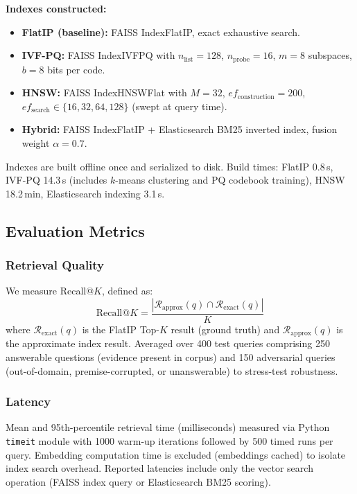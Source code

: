 \documentclass[conference]{IEEEtran}
\begin{document}
\textbf{Indexes constructed:}
\begin{itemize}
    \item \textbf{FlatIP (baseline):} FAISS IndexFlatIP, exact exhaustive search.
    \item \textbf{IVF-PQ:} FAISS IndexIVFPQ with $n_{\mathrm{list}}{=}128$, $n_{\mathrm{probe}}{=}16$, $m{=}8$ subspaces, $b{=}8$ bits per code.
    \item \textbf{HNSW:} FAISS IndexHNSWFlat with $M{=}32$, $ef_{\mathrm{construction}}{=}200$, $ef_{\mathrm{search}} \in \{16, 32, 64, 128\}$ (swept at query time).
    \item \textbf{Hybrid:} FAISS IndexFlatIP + Elasticsearch BM25 inverted index, fusion weight $\alpha{=}0.7$.
\end{itemize}

Indexes are built offline once and serialized to disk. Build times: FlatIP 0.8\,s, IVF-PQ 14.3\,s (includes $k$-means clustering and PQ codebook training), HNSW 18.2\,min, Elasticsearch indexing 3.1\,s.

\subsection{Evaluation Metrics}

\subsubsection{Retrieval Quality}
We measure Recall@$K$, defined as:
\begin{equation}
\mathrm{Recall@}K = \frac{|\mathcal{R}_{\mathrm{approx}}(q) \cap \mathcal{R}_{\mathrm{exact}}(q)|}{K}
\label{eq:recall}
\end{equation}
where $\mathcal{R}_{\mathrm{exact}}(q)$ is the FlatIP Top-$K$ result (ground truth) and $\mathcal{R}_{\mathrm{approx}}(q)$ is the approximate index result. Averaged over 400 test queries comprising 250 answerable questions (evidence present in corpus) and 150 adversarial queries (out-of-domain, premise-corrupted, or unanswerable) to stress-test robustness.

\subsubsection{Latency}
Mean and 95th-percentile retrieval time (milliseconds) measured via Python \texttt{timeit} module with 1000 warm-up iterations followed by 500 timed runs per query. Embedding computation time is excluded (embeddings cached) to isolate index search overhead. Reported latencies include only the vector search operation (FAISS index query or Elasticsearch BM25 scoring).
\end{document}
